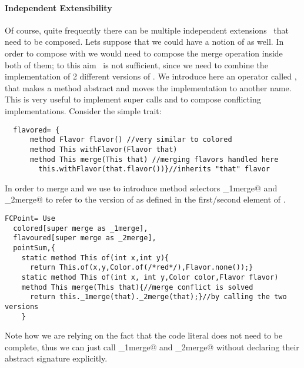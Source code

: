 \paragraph{Independent Extensibility}
  Of course, quite frequently there can be multiple independent
  extensions~\cite{Zenger-Odersky2005} that need to be composed. Lets suppose that 
  we could have a notion of \Q@flavoured@ as well.   
  In order to compose \Q@colored@ with \Q@flavored@ we would
  need to compose the merge operation inside both of them; to this aim \use\ is not sufficient, since we need to combine the implementation of 2 different versions of \Q@merge@.
We introduce here an operator called \Q@super@, that
 makes a method abstract and
moves the implementation to another name. This is very useful to implement super calls
 and to compose conflicting implementations.
\noindent Consider the simple \Q@flavored@ trait:
\saveSpace\begin{lstlisting}
  flavored= {
      method Flavor flavor() //very similar to colored
      method This withFlavor(Flavor that)
      method This merge(This that) //merging flavors handled here
        this.withFlavor(that.flavor())}//inherits "that" flavor
\end{lstlisting}  \saveSpace\saveSpace

\noindent In order to merge \Q@colored@ and \Q@flavored@ we use  \Q@super@ to introduce method selectors \Q@_1merge@ and \Q@_2merge@
to refer to the version of \Q@merge@ as defined in the first/second element of \use.

\saveSpace\begin{lstlisting}
FCPoint= Use
  colored[super merge as _1merge],
  flavoured[super merge as _2merge],
  pointSum,{
    static method This of(int x,int y){
      return This.of(x,y,Color.of(/*red*/),Flavor.none());}
    static method This of(int x, int y,Color color,Flavor flavor)
    method This merge(This that){//merge conflict is solved 
      return this._1merge(that)._2merge(that);}//by calling the two versions
    }
\end{lstlisting}  \saveSpace\saveSpace

Note how we are relying on the fact that the code literal
 does not need to be complete, 
thus we can just call \Q@_1merge@ and \Q@_2merge@ without
 declaring their abstract signature explicitly.



